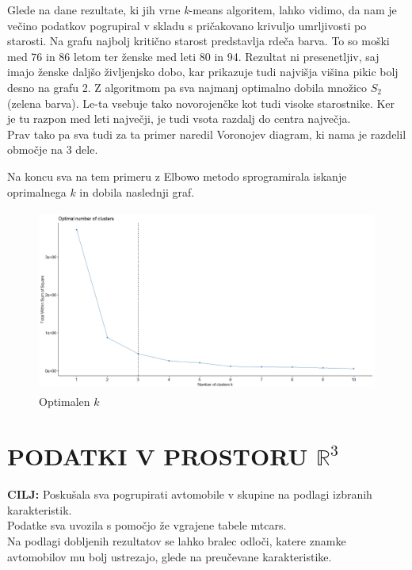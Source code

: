 \documentclass[11pt, a4paper]{article}
\begin{document}
\noindent Glede na dane rezultate, ki jih vrne \textsl{k}-means algoritem, lahko vidimo, da nam je večino podatkov pogrupiral v skladu s pričakovano krivuljo umrljivosti po starosti. 
Na grafu najbolj kritično starost predstavlja rdeča barva. To so moški med 76 in 86 letom ter ženske med leti 80 in 94. Rezultat ni presenetljiv, saj imajo ženske daljšo življenjsko dobo, kar prikazuje tudi najvišja višina pikic bolj desno na grafu 2.
\noindent Z algoritmom pa sva najmanj optimalno dobila množico $S_2$ (zelena barva). Le-ta vsebuje tako novorojenčke kot tudi visoke starostnike. Ker je tu razpon med leti največji, je tudi vsota razdalj do centra največja. \\

\noindent Prav tako pa sva tudi za ta primer naredil Voronojev diagram, ki nama je razdelil območje na 3 dele.

\vspace{0.5 cm}

\noindent Na koncu sva na tem primeru z Elbowo metodo sprogramirala iskanje oprimalnega $k$ in dobila naslednji graf.

\begin{figure}[h]
\caption{Optimalen $k$}
\centering
\includegraphics[width=12cm, height=6cm]{optkumrli}
\end{figure}


\newpage

\section{PODATKI V PROSTORU $\mathbb{R}^3$}
\textbf{CILJ:} Poskušala sva pogrupirati avtomobile v skupine na podlagi izbranih karakteristik. \\

\noindent Podatke sva uvozila s pomočjo že vgrajene tabele mtcars.\\
\noindent Na podlagi dobljenih rezultatov se lahko bralec odloči, katere znamke avtomobilov mu bolj ustrezajo, glede na preučevane karakteristike. \\
\end{document}
